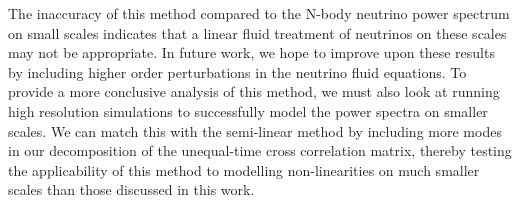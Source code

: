 \documentclass[twocolumn,superscriptaddress,prd]{revtex4}
\begin{document}
The inaccuracy of this method compared to the
N-body neutrino power spectrum on small scales 
indicates that a linear
fluid treatment of neutrinos on these scales may not be appropriate.
In future work, we hope to improve upon these results by
including higher order perturbations in the neutrino fluid equations.
To provide a more conclusive
analysis of this method, we must also look at
running high resolution simulations to successfully model the
power spectra on smaller scales.  We can match this with the
semi-linear method by including more modes in our decomposition of the
unequal-time cross correlation matrix, thereby testing the applicability of
this method to modelling non-linearities on much smaller scales than
those 
discussed in this work. 
\end{document}
